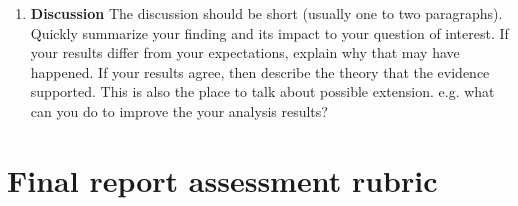 \documentclass[a4paper,10pt]{article}
\begin{document}
\begin{enumerate}
\item \textbf{Discussion}
\newline
The discussion should be short (usually one to two paragraphs).
Quickly summarize your finding and its impact to your question of interest. 
If your results differ from your expectations, explain why that may have happened. 
If your results agree, then describe the theory that the evidence supported. 
This is also the place to talk about possible extension. e.g. what can you do to improve the your analysis results?
\end{enumerate}



\newpage
\section*{Final report assessment rubric}
\end{document}
